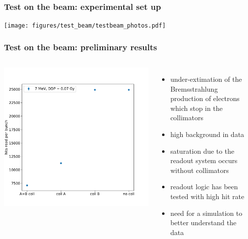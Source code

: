     \begin{frame}
        \frametitle{Test on the beam: experimental set up}
        \centering
        \texttt{[image: figures/test\_beam/testbeam\_photos.pdf]}  
    \end{frame}    


    \begin{frame}
        \frametitle{Test on the beam: preliminary results}
        \begin{columns}
                \includegraphics[width=1.1\linewidth]{figures/test_beam/hits.pdf}  
                \begin{itemize}
                    \item under-extimation of the Bremsstrahlung production of electrons which stop in the collimators 
                    \item high background in data
                    \item saturation due to the readout system occurs without collimators
                    \item readout logic has been tested with high hit rate
                    \item need for a simulation to better understand the data
                \end{itemize}
            \end{columns}
        \end{frame}  